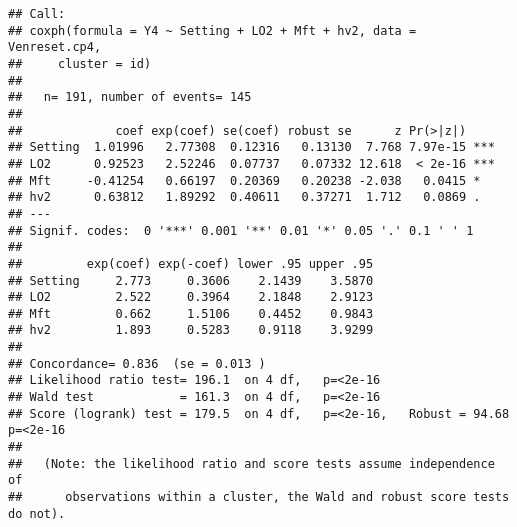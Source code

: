 \documentclass[
]{article}
\newenvironment{Shaded}{\begin{snugshade}}{\end{snugshade}}
\newcommand{\AttributeTok}[1]{\textcolor[rgb]{0.77,0.63,0.00}{#1}}
\newcommand{\CommentTok}[1]{\textcolor[rgb]{0.56,0.35,0.01}{\textit{#1}}}
\newcommand{\DecValTok}[1]{\textcolor[rgb]{0.00,0.00,0.81}{#1}}
\newcommand{\FunctionTok}[1]{\textcolor[rgb]{0.00,0.00,0.00}{#1}}
\newcommand{\NormalTok}[1]{#1}
\newcommand{\OtherTok}[1]{\textcolor[rgb]{0.56,0.35,0.01}{#1}}
\newcommand{\SpecialCharTok}[1]{\textcolor[rgb]{0.00,0.00,0.00}{#1}}
\newcommand{\StringTok}[1]{\textcolor[rgb]{0.31,0.60,0.02}{#1}}
\begin{document}
\begin{Shaded}
\end{Shaded}

\begin{verbatim}
## Call:
## coxph(formula = Y4 ~ Setting + LO2 + Mft + hv2, data = Venreset.cp4, 
##     cluster = id)
## 
##   n= 191, number of events= 145 
## 
##             coef exp(coef) se(coef) robust se      z Pr(>|z|)    
## Setting  1.01996   2.77308  0.12316   0.13130  7.768 7.97e-15 ***
## LO2      0.92523   2.52246  0.07737   0.07332 12.618  < 2e-16 ***
## Mft     -0.41254   0.66197  0.20369   0.20238 -2.038   0.0415 *  
## hv2      0.63812   1.89292  0.40611   0.37271  1.712   0.0869 .  
## ---
## Signif. codes:  0 '***' 0.001 '**' 0.01 '*' 0.05 '.' 0.1 ' ' 1
## 
##         exp(coef) exp(-coef) lower .95 upper .95
## Setting     2.773     0.3606    2.1439    3.5870
## LO2         2.522     0.3964    2.1848    2.9123
## Mft         0.662     1.5106    0.4452    0.9843
## hv2         1.893     0.5283    0.9118    3.9299
## 
## Concordance= 0.836  (se = 0.013 )
## Likelihood ratio test= 196.1  on 4 df,   p=<2e-16
## Wald test            = 161.3  on 4 df,   p=<2e-16
## Score (logrank) test = 179.5  on 4 df,   p=<2e-16,   Robust = 94.68  p=<2e-16
## 
##   (Note: the likelihood ratio and score tests assume independence of
##      observations within a cluster, the Wald and robust score tests do not).
\end{verbatim}
\end{document}
